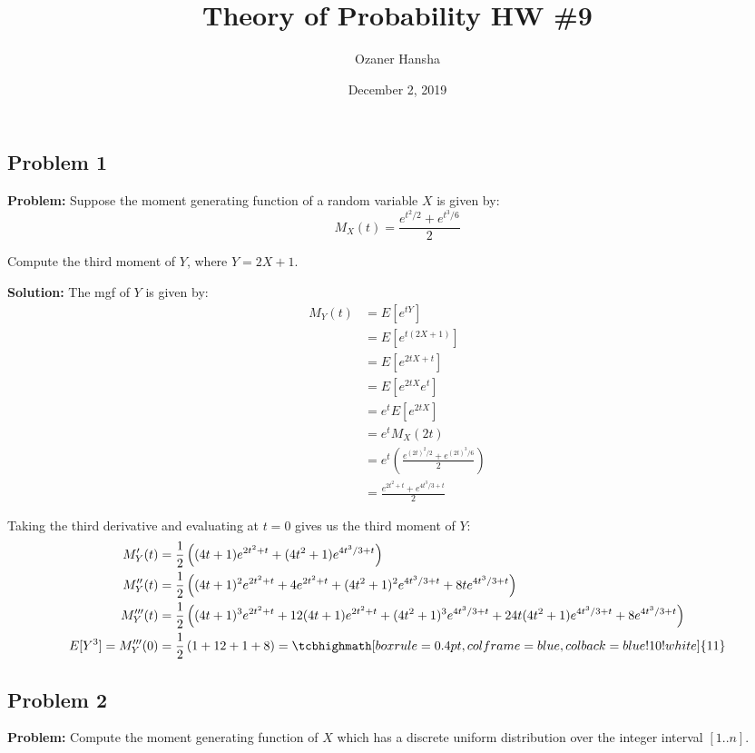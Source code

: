 \documentclass{article}
\begin{document}
\title{Theory of Probability HW \#9}
\author{Ozaner Hansha}
\date{December 2, 2019}
\maketitle

\subsection*{Problem 1}
\noindent\textbf{Problem:} Suppose the moment generating function of a random variable $X$ is given by:
\begin{equation*}
    M_X(t)=\frac{e^{t^2/2}+e^{t^3/6}}{2}
\end{equation*}

Compute the third moment of $Y$, where $Y=2X+1$.
\bigskip

\noindent\textbf{Solution:} The mgf of $Y$ is given by:
\begin{align*}
    M_Y(t)&=E[e^{tY}]\tag{def. of mgf}\\
    &=E[e^{t(2X+1)}]\\
    &=E[e^{2tX+t}]\\
    &=E[e^{2tX}e^{t}]\\
    &=e^{t}E[e^{2tX}]\\
    &=e^{t}M_X(2t)\\
    &=e^{t}\left(\frac{e^{(2t)^2/2}+e^{(2t)^3/6}}{2}\right)\\
    &=\frac{e^{2t^2+t}+e^{4t^3/3+t}}{2}
\end{align*}

Taking the third derivative and evaluating at $t=0$ gives us the third moment of $Y$:
\begin{align*}
    M_Y'(t)&=\frac{1}{2}\left((4t+1)e^{2t^2+t}+(4t^2+1)e^{4t^3/3+t}\right)\\
    M_Y''(t)&=\frac{1}{2}\left((4t+1)^2e^{2t^2+t}+4e^{2t^2+t}+(4t^2+1)^2e^{4t^3/3+t}+8te^{4t^3/3+t}\right)\\
    M_Y'''(t)&=\frac{1}{2}\left((4t+1)^3e^{2t^2+t}+12(4t+1)e^{2t^2+t}+(4t^2+1)^3e^{4t^3/3+t}+24t(4t^2+1)e^{4t^3/3+t}+8e^{4t^3/3+t}\right)\\
    E[Y^3]=M_Y'''(0)&=\frac{1}{2}\left(1+12+1+8\right)=\tcbhighmath[boxrule=0.4pt,colframe=blue,colback=blue!10!white]{11}
\end{align*}

\subsection*{Problem 2}
\noindent\textbf{Problem:} Compute the moment generating function of $X$ which has a discrete uniform distribution over the integer interval $[1..n]$.
\bigskip
\end{document}
